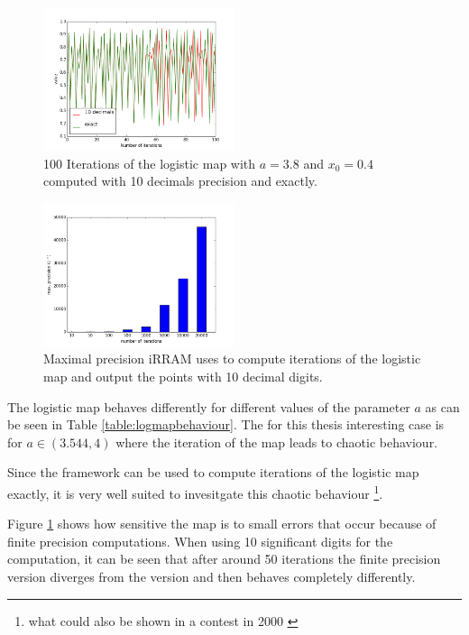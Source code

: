   \begin{figure}
    \centering
    \includegraphics[width=0.5\textwidth]{img/dynamic_systems/logmap1}
    \caption{100 Iterations of the logistic map with $a=3.8$ and $x_0 = 0.4$ computed with 10 decimals precision and exactly.}
    \label{fig:logmaperror1}  
  \end{figure}
    \begin{figure}
    \centering
    \includegraphics[width=0.5\textwidth]{img/dynamic_systems/logmap2}
    \caption{Maximal precision iRRAM uses to compute iterations of the logistic map and output the points with 10 decimal digits.}
    \label{fig:logmapprec}
  \end{figure}
  The logistic map behaves differently for different values of the parameter $a$ as can be seen in Table \ref{table:logmapbehaviour}. 
  The for this thesis interesting case is for $a \in (3.544, 4)$ where the iteration of the map leads to chaotic behaviour.

  Since the \irram framework can be used to compute iterations of the logistic map exactly, it is very well suited to invesitgate this chaotic behaviour \footnote{what could also be shown in a contest in 2000 \cite{competition:2001}}. 

  Figure \ref{fig:logmaperror1} shows how sensitive the map is to small errors that occur because of finite precision computations. 
  When using 10 significant digits for the computation, it can be seen that after around 50 iterations the finite precision version diverges from the \irram version and then behaves completely differently. 

